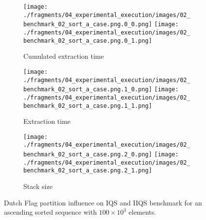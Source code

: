 \begin{figure}
    \centering
    \begin{subfigure}[b]{\textwidth}
        \centering
        \texttt{[image: ./fragments/04\_experimental\_execution/images/02\_benchmark\_02\_sort\_a\_case.png.0\_0.png]}
        \texttt{[image: ./fragments/04\_experimental\_execution/images/02\_benchmark\_02\_sort\_a\_case.png.0\_1.png]}
        \caption{Cumulated extraction time}
        \label{FIG:PARTITION_SCHEME_01_ASCENDING__0_0}
    \end{subfigure}

    \begin{subfigure}[b]{\textwidth}
        \centering
        \texttt{[image: ./fragments/04\_experimental\_execution/images/02\_benchmark\_02\_sort\_a\_case.png.1\_0.png]}
        \texttt{[image: ./fragments/04\_experimental\_execution/images/02\_benchmark\_02\_sort\_a\_case.png.1\_1.png]}
        \caption{Extraction time}
        \label{FIG:PARTITION_SCHEME_01_ASCENDING__0_1}
    \end{subfigure}

    \begin{subfigure}[b]{\textwidth}
        \centering
        \texttt{[image: ./fragments/04\_experimental\_execution/images/02\_benchmark\_02\_sort\_a\_case.png.2\_0.png]}
        \texttt{[image: ./fragments/04\_experimental\_execution/images/02\_benchmark\_02\_sort\_a\_case.png.2\_1.png]}
        \caption{Stack size}
        \label{FIG:PARTITION_SCHEME_01_ASCENDING__0_2}
    \end{subfigure}
    
    \caption{Dutch Flag partition influence on IQS and IIQS benchmark for an ascending sorted sequence with $100\times10^3$ elements.}
    \label{FIG:PARTITION_SCHEME_01_ASCENDING}
\end{figure}




